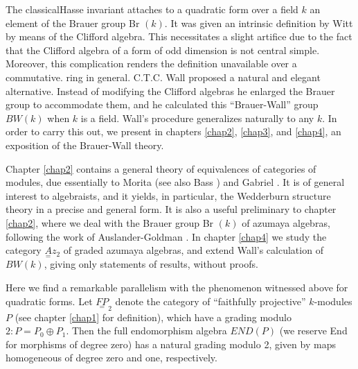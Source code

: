 The classical\pageoriginale Hasse invariant attaches to a quadratic
form over a 
field $k$ an element of the Brauer group Br $(k)$. It was given an
intrinsic definition by Witt \cite{key1} by means of the Clifford
algebra. This necessitates a slight artifice due to the fact that the
Clifford algebra of a form of odd dimension is not central
simple. Moreover, this complication renders the definition unavailable
over a commutative. ring in general. C.T.C. Wall \cite{key1} proposed a
natural and elegant alternative. Instead of modifying the Clifford
algebras he enlarged the Brauer group to accommodate them, and he
calculated this ``Brauer-Wall'' group $BW(k)$ when $k$ is a
field. Wall's procedure generalizes naturally to any $k$. In order to
carry this out, we present in chapters \ref{chap2}, \ref{chap3}, and
\ref{chap4}, an exposition 
of the Brauer-Wall theory. 

Chapter \ref{chap2} contains a general theory of equivalences of categories of
modules, due essentially to Morita \cite{key1} (see also Bass
\cite{key2}) and Gabriel 
\cite{key1}. It is of general interest to algebraists, and it yields, in
particular, the Wedderburn structure theory in a precise and general
form. It is also a useful preliminary to chapter \ref{chap2}, where we deal
with the Brauer group Br $(k)$ of azumaya algebras, following the work
of Auslander-Goldman \cite{key1}. In chapter \ref{chap4} we study the category
$\underset{=}A z_2$ of graded azumaya algebras, and extend Wall's
calculation of $BW(k)$, giving only statements of results, without
proofs. 

Here \pageoriginale we find a remarkable parallelism with the
phenomenon witnessed 
above for quadratic forms. Let $\underset{=}{FP}_2$ denote the
category of ``faithfully projective'' $k$-modules $P$ (see chapter \ref{chap1}
for definition), which have a grading modulo $2: P = P_0 \oplus
P_1$. Then the full endomorphism algebra $END(P)$ (we reserve End for
morphisms of degree zero) has a natural grading modulo 2, given by
maps homogeneous of degree zero and one, respectively. 

